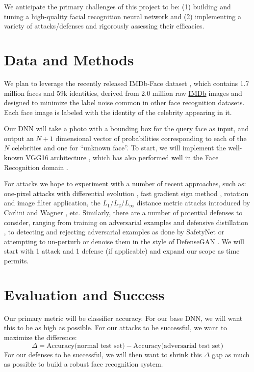\documentclass{article}
\begin{document}
We anticipate the primary challenges of this project to be: (1) building and tuning a high-quality facial recognition neural network and (2) implementing a variety of attacks/defenses and rigorously assessing their efficacies.

\section{Data and Methods}
We plan to leverage the recently released IMDb-Face dataset \cite{wang2018devil}, which contains 1.7 million faces and 59k identities, derived from 2.0 million raw \href{https://www.imdb.com/}{IMDb} images and designed to minimize the label noise common in other face recognition datasets. Each face image is labeled with the identity of the celebrity appearing in it.

Our DNN will take a photo with a bounding box for the query face as input, and output an $N+1$ dimensional vector of probabilities corresponding to each of the $N$ celebrities and one for ``unknown face''. To start, we will implement the well-known VGG16 architecture \cite{simonyan2015very}, which has also performed well in the Face Recognition domain \cite{survey}.


For attacks we hope to experiment with a number of recent approaches, such as: one-pixel attacks with differential evolution \cite{1pixel}, fast gradient sign method \cite{fgsm}, rotation and image filter application, the $L_1$/$L_2$/$L_\infty$ distance metric attacks introduced by Carlini and Wagner \cite{carliniw}, etc. Similarly, there are a number of potential defenses to consider, ranging from training on adversarial examples and defensive distillation \cite{defensivedistillation}, to detecting and rejecting adversarial examples as done by SafetyNet \cite{safetynet} or attempting to un-perturb or denoise them in the style of DefenseGAN \cite{defensegan}. We will start with 1 attack and 1 defense (if applicable) and expand our scope as time permits.


\section{Evaluation and Success}
Our primary metric will be classifier accuracy. For our base DNN, we will want this to be as high as possible. For our attacks to be successful, we want to maximize the difference:
$$\Delta=\text{Accuracy(normal test set)}-\text{Accuracy(adversarial test set)}$$
For our defenses to be successful, we will then want to shrink this $\Delta$ gap as much as possible to build a robust face recognition system.
\end{document}
